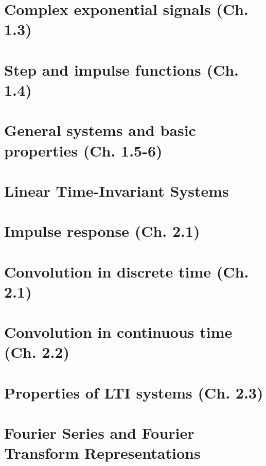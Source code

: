 \documentclass{article}
\begin{document}
\section{Complex exponential signals (Ch. 1.3)}

\newpage

\section{Step and impulse functions (Ch. 1.4)}

\newpage

\section{General systems and basic properties (Ch. 1.5-6)}

\newpage

\section*{Linear Time-Invariant Systems}
\section{Impulse response (Ch. 2.1)}

\newpage

\section{Convolution in discrete time (Ch. 2.1)}

\newpage

\section{Convolution in continuous time (Ch. 2.2)}

\newpage

\section{Properties of LTI systems (Ch. 2.3)} %

\newpage

\section*{Fourier Series and Fourier Transform Representations}
\end{document}
